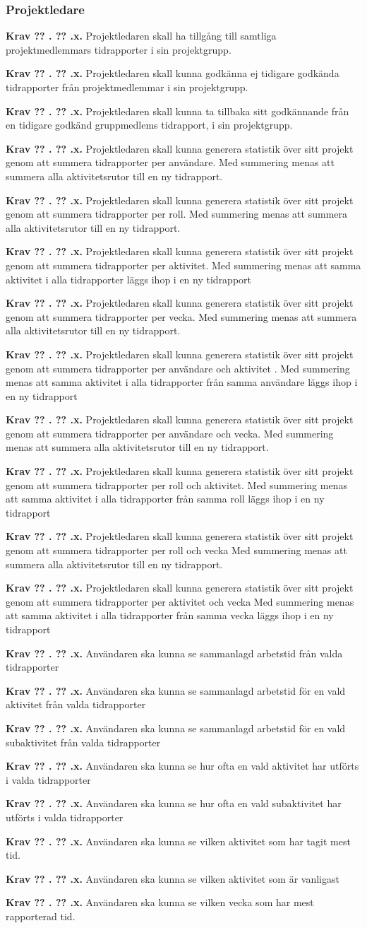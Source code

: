 \documentclass[a4paper]{article}
\newcommand\getcurrentref[1]{%
 \ifnumequal{\value{#1}}{0}
  {??}
  {\the\value{#1}}%
}
\newcommand\requirement[2]{
	\numberedrow{Krav}{#1}{#2}
}
\newcommand\numberedrow[3]{
	\noindent
	\textbf{#1 \getcurrentref{section}.\getcurrentref{subsection}.#2.} #3
	
}
\begin{document}
		\subsubsection*{Projektledare}
			\requirement{x}{Projektledaren skall ha tillgång till samtliga projektmedlemmars tidrapporter i sin projektgrupp.}
			\requirement{x}{Projektledaren skall kunna godkänna ej tidigare godkända tidrapporter från projektmedlemmar i sin projektgrupp.}
			\requirement{x}{Projektledaren skall kunna ta tillbaka sitt godkännande från en tidigare godkänd gruppmedlems tidrapport, i sin projektgrupp.}
			\requirement{x}{Projektledaren skall kunna generera statistik över sitt projekt genom att summera tidrapporter per användare. Med summering menas att summera alla aktivitetsrutor till en ny tidrapport.}
			\requirement{x}{Projektledaren skall kunna generera statistik över sitt projekt genom att summera tidrapporter per roll. Med summering menas att summera alla aktivitetsrutor till en ny tidrapport.}
			\requirement{x}{Projektledaren skall kunna generera statistik över sitt projekt genom att summera tidrapporter per aktivitet. Med summering menas att samma aktivitet i alla tidrapporter läggs ihop i en ny tidrapport}
			\requirement{x}{Projektledaren skall kunna generera statistik över sitt projekt genom att summera tidrapporter per vecka. Med summering menas att summera alla aktivitetsrutor till en ny tidrapport.}
			\requirement{x}{Projektledaren skall kunna generera statistik över sitt projekt genom att summera tidrapporter per användare och aktivitet . Med summering menas att samma aktivitet i alla tidrapporter från samma användare läggs ihop i en ny tidrapport}
			\requirement{x}{Projektledaren skall kunna generera statistik över sitt projekt genom att summera tidrapporter per användare och vecka. Med summering menas att summera alla aktivitetsrutor till en ny tidrapport.}
			\requirement{x}{Projektledaren skall kunna generera statistik över sitt projekt genom att summera tidrapporter per roll och aktivitet. Med summering menas att samma aktivitet i alla tidrapporter från samma roll läggs ihop i en ny tidrapport}
			\requirement{x}{Projektledaren skall kunna generera statistik över sitt projekt genom att summera tidrapporter per roll och vecka Med summering menas att summera alla aktivitetsrutor till en ny tidrapport.}
			\requirement{x}{Projektledaren skall kunna generera statistik över sitt projekt genom att summera tidrapporter per aktivitet och vecka Med summering menas att samma aktivitet i alla tidrapporter från samma vecka läggs ihop i en ny tidrapport}
			\requirement{x}{Användaren ska kunna se sammanlagd arbetstid från valda tidrapporter}
			\requirement{x}{Användaren ska kunna se sammanlagd arbetstid för en vald aktivitet från valda tidrapporter}
			\requirement{x}{Användaren ska kunna se sammanlagd arbetstid för en vald subaktivitet från valda tidrapporter}
			\requirement{x}{Användaren ska kunna se hur ofta en vald aktivitet har utförts i valda tidrapporter}
			\requirement{x}{Användaren ska kunna se hur ofta en vald subaktivitet har utförts i valda tidrapporter}
			\requirement{x}{Användaren ska kunna se vilken aktivitet som har tagit mest tid.}
			\requirement{x}{Användaren ska kunna se vilken aktivitet som är vanligast}
			\requirement{x}{Användaren ska kunna se vilken vecka som har mest rapporterad tid.	}
\end{document}

